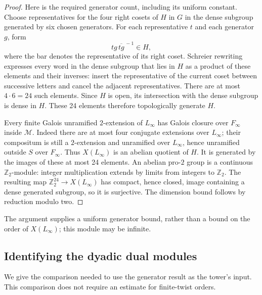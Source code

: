 \begin{proof}
Here is the required generator count, including its uniform constant.
Choose representatives for the four right cosets of \(H\) in \(G\)
in the dense subgroup generated by six chosen generators.
For each representative \(t\) and each generator \(g\), form
\[
                    t g\,\overline{t g}^{\, -1}\in H ,
\]
where the bar denotes the representative of its right coset.
Schreier rewriting expresses every word in the dense subgroup
that lies in \(H\) as a product of these elements and their
inverses: insert the representative of the current coset between
successive letters and cancel the adjacent representatives.
There are at most \(4\cdot6=24\) such elements.
Since \(H\) is open, its intersection with the dense subgroup is
dense in \(H\). These 24 elements therefore topologically generate
\(H\).

Every finite Galois unramified \(2\)-extension of \(L_\infty\)
has Galois closure over \(F_\infty\) inside \(\mathcal M\).
Indeed there are at most four conjugate extensions over
\(L_\infty\); their compositum is still a \(2\)-extension and
unramified over \(L_\infty\), hence unramified outside \(S\) over
\(F_\infty\). Thus \(X(L_\infty)\) is an abelian quotient of \(H\).
It is generated by the images of these at most 24 elements.
An abelian pro-\(2\) group is a continuous \(\mathbb Z_2\)-module:
integer multiplication extends by limits from integers to
\(\mathbb Z_2\). The resulting map
\(\mathbb Z_2^{24}\to X(L_\infty)\) has compact, hence closed,
image containing a dense generated subgroup, so it is surjective.
The dimension bound follows by reduction modulo two.
\end{proof}

The argument supplies a uniform generator bound, rather than a bound
on the order of \(X(L_\infty)\); this module may be infinite.

\subsection{Identifying the dyadic dual modules}
\label{sec:sr-dyadic-dual}
We give the comparison needed to use the generator result as the tower's
input. This comparison does not require an estimate for finite-twist
orders.

